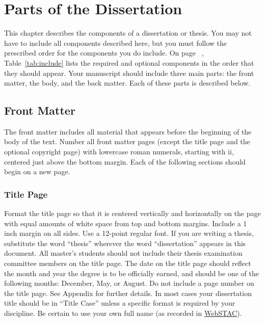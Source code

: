 \chapter{Parts of the Dissertation}
\label{ch:1}

This chapter describes the components of a dissertation or thesis.
You may not have to include all components described here, but you must follow the prescribed order for the components you do include.
On page ~\pageref{tab:include}, Table~\ref{tab:include} lists the required and optional components in the order that they should appear.
Your manuscript should include three main parts: the front matter, the body, and the back matter.
Each of these parts is described below.

\section{Front Matter}

The front matter includes all material that appears before the beginning of the body of the text.
Number all front matter pages (except the title page and the optional copyright page) with lowercase roman numerals, starting with ii, centered just above the bottom margin.
Each of the following sections should begin on a new page.

\subsection{Title Page}

Format the title page so that it is centered vertically and horizontally on the page with equal amounts of white space from top and bottom margins.
Include a 1 inch margin on all sides.
Use a 12-point regular font.
If you are writing a thesis, substitute the word ``thesis'' wherever the word ``dissertation'' appears in this document.
All master's students should not include their thesis examination committee members on the title page.
The date on the title page should reflect the month and year the degree is to be officially earned, and should be one of the following months: December, May, or August.
Do not include a page number on the title page.
See Appendix for further details.
In most cases your dissertation title should be in ``Title Case'' unless a specific format is required by your discipline.
Be certain to use your own full name (as recorded in \href{https://acadinfo.wustl.edu/}{WebSTAC}).


